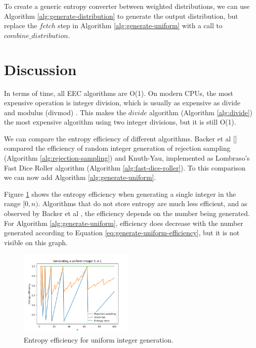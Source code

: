\documentclass[12pt]{article}
\begin{document}
To create a generic entropy converter between weighted distributions, we can use Algorithm \ref{alg:generate-distribution} to generate the output distribution, but replace the $fetch$ step in Algorithm \ref{alg:generate-uniform} with a call to $combine\_distribution$.







\section {Discussion}

In terms of time, all EEC algorithms are O(1). On modern CPUs, the most expensive operation is integer division, which is usually as expensive as divide and modulus (divmod) \cite{cpudivmod}. This makes the $divide$ algorithm (Algorithm \ref{alg:divide}) the most expensive algorithm using two integer divisions, but it is still O(1).




We can compare the entropy efficiency of different algorithms. Backer et al [] compared the efficiency of random integer generation of rejection sampling (Algorithm \ref{alg:rejection-sampling}) and Knuth-Yau, implemented as Lombraso's Fast Dice Roller algorithm (Algorithm \ref{alg:fast-dice-roller}). To this comparison we can now add Algorithm \ref{alg:generate-uniform}.

Figure \ref{fig:uniform} shows the entropy efficiency when generating a single integer in the range $[0,n)$.  Algorithms that do not store entropy are much less efficient, and as observed by Backer et al \cite{todo}, the efficiency depends on the number being generated. For Algorithm \ref{alg:generate-uniform}, efficiency does decrease with the number generated according to Equation \ref{eq:generate-uniform-efficiency}, but it is not visible on this graph.

\begin{figure}[ht]
\centering
\includegraphics[width=0.5\textwidth]{uniform_efficiency.png}
\caption{Entropy efficiency for uniform integer generation.}
\label{fig:uniform}
\end{figure}
\end{document}
